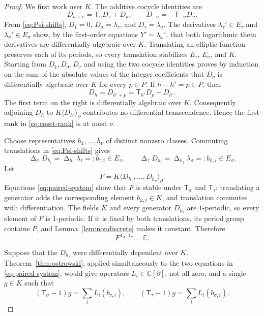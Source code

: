 \documentclass[11pt]{article}
\numberwithin{equation}{section}
\theoremstyle{definition}
\theoremstyle{remark}
\newcommand{\C}{\mathbb C}
\newcommand{\T}{\mathsf T}
\newcommand{\Deltaop}{\mathop{\Delta}}
\begin{document}
\begin{proof}
We first work over $K$.  The additive cocycle identities are
\begin{equation}
 D_{u+v}=\T_uD_v+D_u,
 \qquad D_{-u}=-\T_{-u}D_u.
 \label{eq:additive-cocycle}
\end{equation}
From \eqref{eq:Psi-shifts},
$D_1=0$, $D_\sigma=\lambda_\tau$, and
$D_\tau=\lambda_\sigma$.  The derivatives
$\lambda_\tau'\in E_\tau$ and $\lambda_\sigma'\in E_\sigma$ show, by the
first-order equations $Y'=\lambda_\omega'$, that both logarithmic theta
derivatives are differentially algebraic over $K$.  Translating an elliptic
function preserves each of its periods, so every translation stabilizes
$E_\tau$, $E_\sigma$, and $K$.  Starting from $D_1,D_\sigma,D_\tau$ and
using the two cocycle identities proves by induction on the sum of the
absolute values of the integer coefficients that $D_p$ is differentially
algebraic over $K$ for every $p\in P$.  If $h-h'=p\in P$, then
\[
 D_h=D_{h'+p}=\T_{h'}D_p+D_{h'}.
\]
The first term on the right is differentially algebraic over $K$.
Consequently adjoining $D_h$ to
$K\langle D_{h'}\rangle_\partial$ contributes no differential
transcendence.  Hence the first rank in
\eqref{eq:coset-rank} is at most $\nu$.

Choose representatives $h_1,\ldots,h_\nu$ of distinct nonzero classes.
Commuting translations in \eqref{eq:Psi-shifts} gives
\begin{equation}
 \Deltaop_\sigma D_{h_i}
 =\Deltaop_{h_i}\lambda_\tau=:b_{\tau,i}\in E_\tau,
 \qquad
 \Deltaop_\tau D_{h_i}
 =\Deltaop_{h_i}\lambda_\sigma=:b_{\sigma,i}\in E_\sigma.
 \label{eq:paired-system}
\end{equation}
Let
\[
 F=K\langle D_{h_1},\ldots,D_{h_\nu}\rangle_\partial.
\]
Equations \eqref{eq:paired-system} show that $F$ is stable under
$\T_\sigma$ and $\T_\tau$: translating a generator adds the corresponding
element $b_{\omega,i}\in K$, and translation commutes with differentiation.
The fields $K$ and every generator $D_{h_i}$ are $1$-periodic, so every
element of $F$ is $1$-periodic.  If it is fixed by both translations, its
period group contains $P$, and
Lemma~\ref{lem:nondiscrete} makes it constant.  Therefore
\[
 F^{\T_\sigma,\T_\tau}=\C.
\]

Suppose that the $D_{h_i}$ were differentially dependent over $K$.
Theorem~\ref{thm:ostrowski}, applied simultaneously to the two equations in
\eqref{eq:paired-system}, would give operators
$L_i\in\C[\partial]$, not all zero, and a single $g\in K$ such that
\begin{equation}
 (\T_\sigma-1)g=\sum_iL_i(b_{\tau,i}),
 \qquad
 (\T_\tau-1)g=\sum_iL_i(b_{\sigma,i}).
 \label{eq:paired-coboundary}
\end{equation}


\end{proof}
\end{document}
